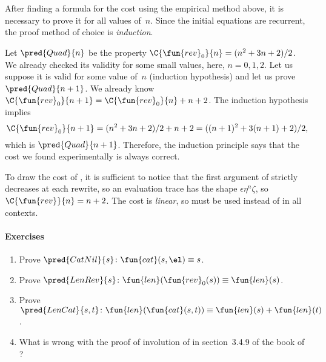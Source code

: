 After finding a formula for the cost using the empirical method above,
it is necessary to prove it for all values of~\(n\). Since the initial
equations are recurrent, the proof method of choice is
\emph{induction}.

Let \(\pred{Quad}{n}\) be the property
\(\C{\fun{rev}_0}{n} = (n^2 + 3n + 2)/2\). We already checked its
validity for some small values, here, \(n = 0, 1, 2\). Let us suppose
it is valid for some value of~\(n\) (induction hypothesis) and let us
prove \(\pred{Quad}{n+1}\). We already know \(\C{\fun{rev}_0}{n+1} =
\C{\fun{rev}_0}{n} + n + 2\). The
induction hypothesis implies
\begin{equation*}
\C{\fun{rev}_0}{n+1} = (n^2 + 3n + 2)/2 + n + 2
                     = ((n+1)^2 + 3(n+1) + 2)/2,
\end{equation*}
which is \(\pred{Quad}{n+1}\). Therefore,
the induction principle says that the cost we found experimentally is
always correct.

To draw the cost of , it is
sufficient to notice that the first argument of
 strictly decreases at each
rewrite, so an evaluation trace has the shape \(\epsilon\eta^n\zeta\),
so \(\C{\fun{rev}}{n} = n + 2\). The cost is
\emph{linear}, so
 must be used instead of
 in all contexts.

\paragraph{Exercises}

\begin{enumerate}

  \item Prove \(\pred{CatNil}{s} \colon \fun{cat}(s,\el) \equiv s\).

  \item Prove \(\pred{LenRev}{s} \colon \fun{len}(\fun{rev}_0(s)) \equiv
  \fun{len}(s)\).

  \item Prove \(\pred{LenCat}{s,t} \colon \fun{len}(\fun{cat}(s,t)) \equiv
  \fun{len}(s) + \fun{len}(t)\).

  \item What is wrong with the proof of involution of
   in section~3.4.9 of the book of
  \cite{CousineauMauny_1998}?

\end{enumerate}
